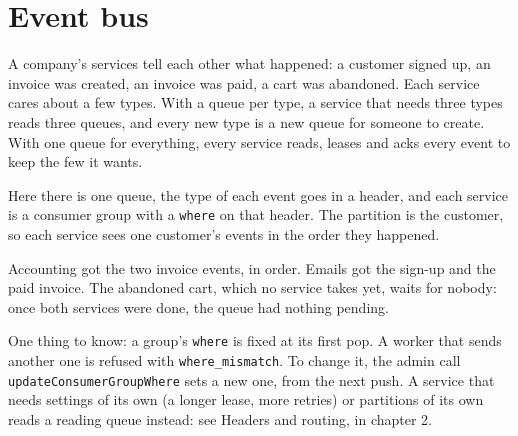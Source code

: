 %

\section{Event bus}

A company's services tell each other what happened: a customer signed up, an invoice was created,
an invoice was paid, a cart was abandoned. Each service cares about a few types. With a queue per
type, a service that needs three types reads three queues, and every new type is a new queue for
someone to create. With one queue for everything, every service reads, leases and acks every event
to keep the few it wants.

Here there is one queue, the type of each event goes in a header, and each service is a consumer
group with a \texttt{where} on that header. The partition is the customer, so each service sees one
customer's events in the order they happened.


Accounting got the two invoice events, in order. Emails got the sign-up and the paid invoice. The
abandoned cart, which no service takes yet, waits for nobody: once both services were done, the
queue had nothing pending.


One thing to know: a group's \texttt{where} is fixed at its first pop. A worker that sends another
one is refused with \texttt{where\_mismatch}. To change it, the admin call
\mbox{\texttt{updateConsumerGroupWhere}} sets a new one, from the next push. A service that
needs settings of its own (a longer lease, more retries) or partitions of its own reads a reading
queue instead: see Headers and routing, in chapter 2.
